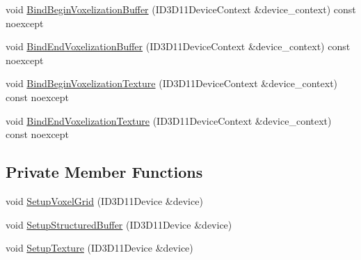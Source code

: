 \begin{DoxyCompactItemize}
\item 
void \hyperlink{classmage_1_1rendering_1_1_voxel_grid_a52254c5709b77d6c348eb15b782b5bc4}{Bind\+Begin\+Voxelization\+Buffer} (I\+D3\+D11\+Device\+Context \&device\+\_\+context) const noexcept
\item 
void \hyperlink{classmage_1_1rendering_1_1_voxel_grid_a2da6ce7a6880b1fc65b36757d8111062}{Bind\+End\+Voxelization\+Buffer} (I\+D3\+D11\+Device\+Context \&device\+\_\+context) const noexcept
\item 
void \hyperlink{classmage_1_1rendering_1_1_voxel_grid_a00fa75aaed950df37be237c9b8557eeb}{Bind\+Begin\+Voxelization\+Texture} (I\+D3\+D11\+Device\+Context \&device\+\_\+context) const noexcept
\item 
void \hyperlink{classmage_1_1rendering_1_1_voxel_grid_ac404f5cb8fd1293e2351ae6106f37fe5}{Bind\+End\+Voxelization\+Texture} (I\+D3\+D11\+Device\+Context \&device\+\_\+context) const noexcept
\end{DoxyCompactItemize}
\subsection*{Private Member Functions}
\begin{DoxyCompactItemize}
\item 
void \hyperlink{classmage_1_1rendering_1_1_voxel_grid_af7796e22a1a02c50c77b2c8d40d800c0}{Setup\+Voxel\+Grid} (I\+D3\+D11\+Device \&device)
\item 
void \hyperlink{classmage_1_1rendering_1_1_voxel_grid_a8f24eca860d059316a1aa40f2e878ecc}{Setup\+Structured\+Buffer} (I\+D3\+D11\+Device \&device)
\item 
void \hyperlink{classmage_1_1rendering_1_1_voxel_grid_aa9b3ab18a4741ab9aa007965a43224eb}{Setup\+Texture} (I\+D3\+D11\+Device \&device)
\end{DoxyCompactItemize}

